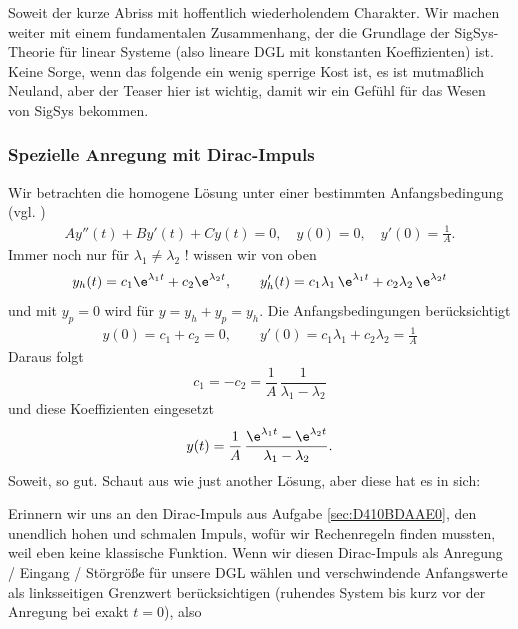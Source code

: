 Soweit der kurze Abriss mit hoffentlich wiederholendem Charakter.
%
Wir machen weiter mit einem fundamentalen Zusammenhang, der die Grundlage der
SigSys-Theorie für linear Systeme (also lineare DGL mit konstanten Koeffizienten)
ist.
%
Keine Sorge, wenn das folgende ein wenig sperrige Kost ist, es ist mutmaßlich
Neuland, aber der Teaser hier ist wichtig, damit wir ein Gefühl für das Wesen von SigSys
bekommen.

\subsubsection{Spezielle Anregung mit Dirac-Impuls}
\label{sec:Spezielle_Anregung_mit_Dirac_Impuls}
Wir betrachten die homogene Lösung unter einer bestimmten Anfangsbedingung
(vgl. \cite[S.97]{Strang2014})
\begin{align}
A y''(t) + B y'(t) + C y(t) = 0,\quad y(0)=0,\quad y'(0)=\frac{1}{A}.
\end{align}
%
Immer noch nur für $\lambda_1 \neq \lambda_2$ ! wissen wir von oben
\begin{align}
y_h(t) = c_1 \e^{\lambda_1 t} + c_2 \e^{\lambda_2 t},\qquad
y_h'(t) = c_1 \lambda_1 \, \e^{\lambda_1 t} + c_2 \lambda_2 \, \e^{\lambda_2 t}
\end{align}
und mit $y_p=0$ wird für $y=y_h+y_p=y_h$.
Die Anfangsbedingungen berücksichtigt
\begin{align}
y(0) = c_1 + c_2 = 0,\qquad
y'(0) = c_1 \lambda_1 + c_2 \lambda_2 = \frac{1}{A}
\end{align}
Daraus folgt
\begin{equation}
c_1 = -c_2 = \frac{1}{A} \, \frac{1}{\lambda_1 - \lambda_2}
\end{equation}
und diese Koeffizienten eingesetzt
\begin{align}
\label{sec:A7BEE9E24E_hyh}
y(t) =
\frac{1}{A} \, \frac{\e^{\lambda_1 t} - \e^{\lambda_2 t}}{\lambda_1 - \lambda_2}.
\end{align}
%
Soweit, so gut. Schaut aus wie just another Lösung, aber diese hat es in sich:
%

Erinnern wir uns an den Dirac-Impuls aus Aufgabe \ref{sec:D410BDAAE0},
den unendlich hohen und schmalen Impuls,
wofür wir Rechenregeln finden mussten, weil eben keine klassische Funktion.
%
Wenn wir diesen Dirac-Impuls als Anregung / Eingang / Störgröße für unsere DGL
wählen und verschwindende Anfangswerte als linksseitigen Grenzwert
berücksichtigen (ruhendes System bis kurz vor der Anregung bei exakt $t=0$), also

